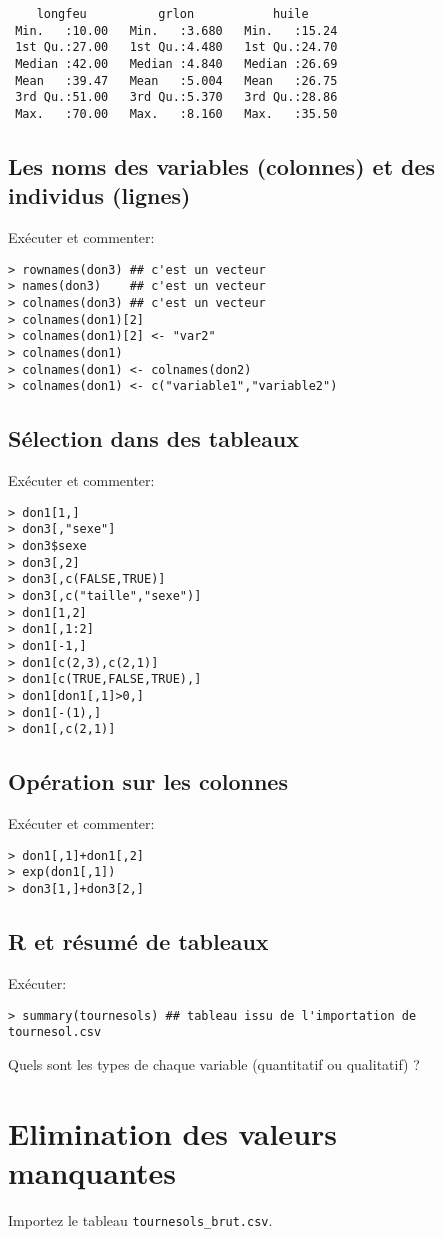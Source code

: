 \documentclass[a4paper,10pt,french]{article}
\begin{document}
\begin{enumerate}
\begin{verbatim}
    longfeu          grlon           huile      
 Min.   :10.00   Min.   :3.680   Min.   :15.24  
 1st Qu.:27.00   1st Qu.:4.480   1st Qu.:24.70  
 Median :42.00   Median :4.840   Median :26.69  
 Mean   :39.47   Mean   :5.004   Mean   :26.75  
 3rd Qu.:51.00   3rd Qu.:5.370   3rd Qu.:28.86  
 Max.   :70.00   Max.   :8.160   Max.   :35.50  
\end{verbatim}
\end{enumerate}
\subsection{Les noms des variables (colonnes) et des individus (lignes)}
Exécuter et commenter:
\begin{verbatim}
> rownames(don3) ## c'est un vecteur
> names(don3)    ## c'est un vecteur
> colnames(don3) ## c'est un vecteur
> colnames(don1)[2]
> colnames(don1)[2] <- "var2"
> colnames(don1)
> colnames(don1) <- colnames(don2)
> colnames(don1) <- c("variable1","variable2")
\end{verbatim}

\subsection{Sélection dans des tableaux}
Exécuter et commenter:
\begin{verbatim}
> don1[1,]
> don3[,"sexe"]
> don3$sexe
> don3[,2]
> don3[,c(FALSE,TRUE)]
> don3[,c("taille","sexe")]
> don1[1,2]
> don1[,1:2]
> don1[-1,]
> don1[c(2,3),c(2,1)]
> don1[c(TRUE,FALSE,TRUE),]
> don1[don1[,1]>0,]
> don1[-(1),]
> don1[,c(2,1)]
\end{verbatim}
\subsection{Opération sur les colonnes}
Exécuter et commenter:
\begin{verbatim}
> don1[,1]+don1[,2]
> exp(don1[,1])
> don3[1,]+don3[2,]
\end{verbatim}
\subsection{\textsf{R} et résumé de tableaux}
Exécuter:
\begin{verbatim}
> summary(tournesols) ## tableau issu de l'importation de tournesol.csv
\end{verbatim}
Quels sont les types de chaque variable (quantitatif ou qualitatif) ?
\section{Elimination des valeurs manquantes}
Importez le tableau \texttt{tournesols\string_brut.csv}.
\end{document}
